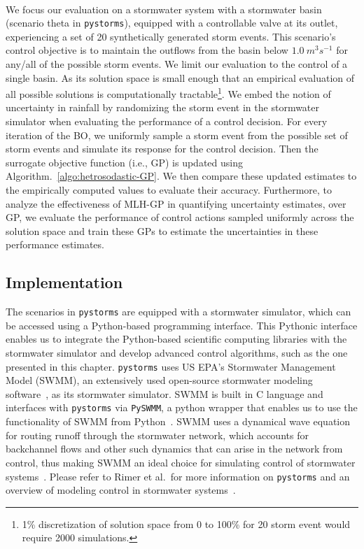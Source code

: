 \

We focus our evaluation on a stormwater system with a stormwater basin (scenario theta in \texttt{pystorms}), equipped with a controllable valve at its outlet, experiencing a set of 20 synthetically generated storm events.
This scenario's control objective is to maintain the outflows from the basin below $1.0\ m^3 s^{-1}$ for any/all of the possible storm events.
We limit our evaluation to the control of a single basin. As its solution space is small enough that an empirical evaluation of all possible solutions is computationally tractable\footnote{1\% discretization of solution space from 0 to 100\% for 20 storm event would require 2000 simulations.}.
We embed the notion of uncertainty in rainfall by randomizing the storm event in the stormwater simulator when evaluating the performance of a control decision. 
For every iteration of the BO, we uniformly sample a storm event from the possible set of storm events and simulate its response for the control decision.  
Then the surrogate objective function (i.e., GP) is updated using Algorithm.~\ref{algo:hetrosodastic-GP}. 
We then compare these updated estimates to the empirically computed values to evaluate their accuracy. 
Furthermore, to analyze the effectiveness of MLH-GP in quantifying uncertainty estimates, over GP, we evaluate the performance of control actions sampled uniformly across the solution space and train these GPs to estimate the uncertainties in these performance estimates.

\subsection{Implementation}\label{sec:implementation}
The scenarios in \texttt{pystorms} are equipped with a stormwater simulator, which can be accessed using a Python-based programming interface.
This Pythonic interface enables us to integrate the Python-based scientific computing libraries with the stormwater simulator and develop advanced control algorithms, such as the one presented in this chapter. 
\texttt{pystorms} uses US EPA's Stormwater Management Model (SWMM), an extensively used open-source stormwater modeling software~\cite{Rossman2015a}, as its stormwater simulator.
SWMM is built in C language and interfaces with \texttt{pystorms} via \texttt{PySWMM}, a python wrapper that enables us to use the functionality of SWMM from Python~\cite{mcdonnell_bryant_e_2020_3751574}.
SWMM uses a dynamical wave equation for routing runoff through the stormwater network, which accounts for backchannel flows and other such dynamics that can arise in the network from control, thus making SWMM an ideal choice for simulating control of stormwater systems~\cite{Mullapudi_Wong_Kerkez_2017}. 
Please refer to Rimer et al.\ for more information on \texttt{pystorms} and an overview of modeling control in stormwater systems~\cite{Rimer2019}.

